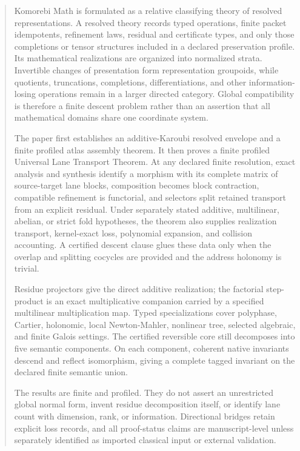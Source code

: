 \documentclass[11pt]{article}
\theoremstyle{definition}
\theoremstyle{remark}
\begin{document}
\thispagestyle{plain}
\begin{abstract}
Komorebi Math is formulated as a relative classifying theory of resolved representations. A resolved theory records typed operations, finite packet idempotents, refinement laws, residual and certificate types, and only those completions or tensor structures included in a declared preservation profile. Its mathematical realizations are organized into normalized strata. Invertible changes of presentation form representation groupoids, while quotients, truncations, completions, differentiations, and other information-losing operations remain in a larger directed category. Global compatibility is therefore a finite descent problem rather than an assertion that all mathematical domains share one coordinate system.

The paper first establishes an additive-Karoubi resolved envelope and a finite profiled atlas assembly theorem. It then proves a finite profiled Universal Lane Transport Theorem. At any declared finite resolution, exact analysis and synthesis identify a morphism with its complete matrix of source-target lane blocks, composition becomes block contraction, compatible refinement is functorial, and selectors split retained transport from an explicit residual. Under separately stated additive, multilinear, abelian, or strict fold hypotheses, the theorem also supplies realization transport, kernel-exact loss, polynomial expansion, and collision accounting. A certified descent clause glues these data only when the overlap and splitting cocycles are provided and the address holonomy is trivial.

Residue projectors give the direct additive realization; the factorial step-product is an exact multiplicative companion carried by a specified multilinear multiplication map. Typed specializations cover polyphase, Cartier, holonomic, local Newton-Mahler, nonlinear tree, selected algebraic, and finite Galois settings. The certified reversible core still decomposes into five semantic components. On each component, coherent native invariants descend and reflect isomorphism, giving a complete tagged invariant on the declared finite semantic union.

The results are finite and profiled. They do not assert an unrestricted global normal form, invent residue decomposition itself, or identify lane count with dimension, rank, or information. Directional bridges retain explicit loss records, and all proof-status claims are manuscript-level unless separately identified as imported classical input or external validation.
\end{abstract}
\end{document}
